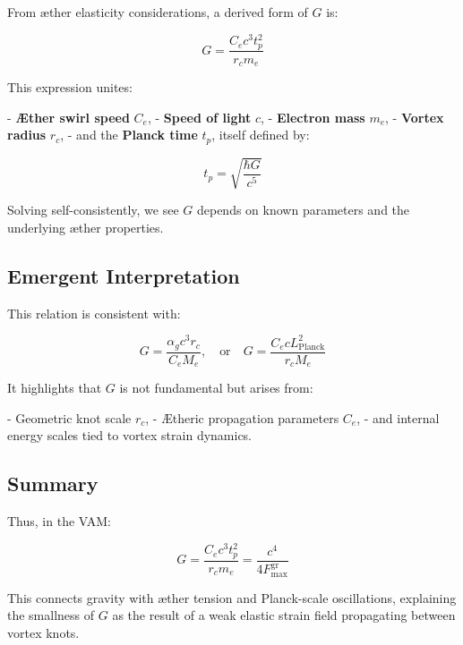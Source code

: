 From æther elasticity considerations, a derived form of \( G \) is:

\begin{equation}
    G = \frac{C_e c^3 t_p^2}{r_c m_e}
\end{equation}

This expression unites:

- \textbf{Æther swirl speed} \( C_e \),
- \textbf{Speed of light} \( c \),
- \textbf{Electron mass} \( m_e \),
- \textbf{Vortex radius} \( r_c \),
- and the \textbf{Planck time} \( t_p \), itself defined by:

\[
    t_p = \sqrt{\frac{\hbar G}{c^5}}
\]

Solving self-consistently, we see \( G \) depends on known parameters and the underlying æther properties.

\subsection*{Emergent Interpretation}

This relation is consistent with:

\[
    G = \frac{\alpha_g c^3 r_c}{C_e M_e}, \quad \text{or} \quad G = \frac{C_e c L_{\text{Planck}}^2}{r_c M_e}
\]

It highlights that \( G \) is not fundamental but arises from:

- Geometric knot scale \( r_c \),
- Ætheric propagation parameters \( C_e \),
- and internal energy scales tied to vortex strain dynamics.

\subsection*{Summary}

Thus, in the VAM:

\begin{equation}
    \boxed{G = \frac{C_e c^3 t_p^2}{r_c m_e} = \frac{c^4}{4 F^{\text{gr}}_{\text{max}}}}
\end{equation}

This connects gravity with æther tension and Planck-scale oscillations, explaining the smallness of \( G \) as the result of a weak elastic strain field propagating between vortex knots.

